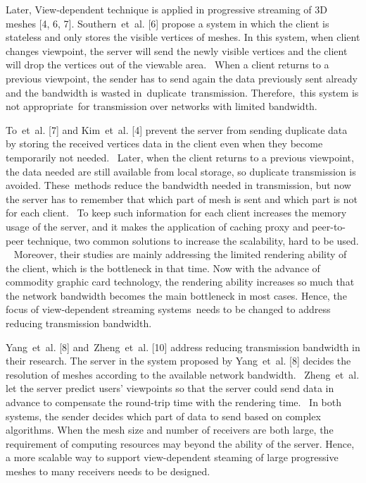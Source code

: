\documentclass[11pt, a4paper]{report}
\begin{document}
    Later, View-dependent technique is applied in progressive streaming of 3D meshes [4, 6, 7].
    Southern et al. [6] propose a system in which the client is stateless 
    and only stores the visible vertices of meshes. 
    In this system, when client changes viewpoint, 
    the server will send the newly visible vertices and the client 
    will drop the vertices out of the viewable area. 
    When a client returns to a previous viewpoint, 
    the sender has to send again the data previously sent already 
    and the bandwidth is wasted in duplicate transmission. 
    Therefore, this system is not appropriate for transmission
    over networks with limited bandwidth. 

    To et al. [7] and Kim et al. [4] prevent the server 
    from sending duplicate data by storing the received vertices data 
    in the client even when they become temporarily not needed. 
    Later, when the client returns to a previous viewpoint, 
    the data needed are still available from local storage, 
    so duplicate transmission is avoided. 
    These methods reduce the bandwidth needed in transmission, 
    but now the server has to remember that which part of mesh is sent
    and which part is not for each client. 
    To keep such information for each client increases the memory usage of the server, 
    and it makes the application of caching proxy and peer-to-peer technique, 
    two common solutions to increase the scalability, hard to be used.  
    Moreover, their studies are mainly addressing the limited rendering ability of the client,
    which is the bottleneck in that time. 
    Now with the advance of commodity graphic card technology, 
    the rendering ability increases so much that the network bandwidth becomes the main bottleneck
    in most cases. Hence, the focus of view-dependent streaming systems needs to be changed
    to address reducing transmission bandwidth.

    Yang et al. [8] and Zheng et al. [10] address reducing transmission bandwidth in their research. 
    The server in the system proposed by Yang et al. [8] decides the resolution of meshes
    according to the available network bandwidth. 
    Zheng et al. let the server predict users' viewpoints so that the server could send data in advance 
    to compensate the round-trip time with the rendering time. 
    In both systems, the sender decides which part of data to send based on complex algorithms. 
    When the mesh size and number of receivers are both large, the requirement of computing resources
    may beyond the ability of the server. 
    Hence, a more scalable way to support view-dependent steaming of large progressive meshes 
    to many receivers needs to be designed.
    
\end{document}
